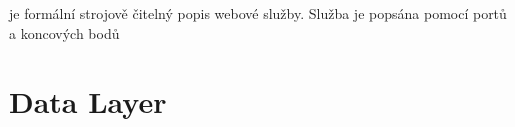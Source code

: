 { je formální strojově čitelný popis webové služby. Služba je popsána pomocí portů a koncových bodů






\section{Data Layer}

}
